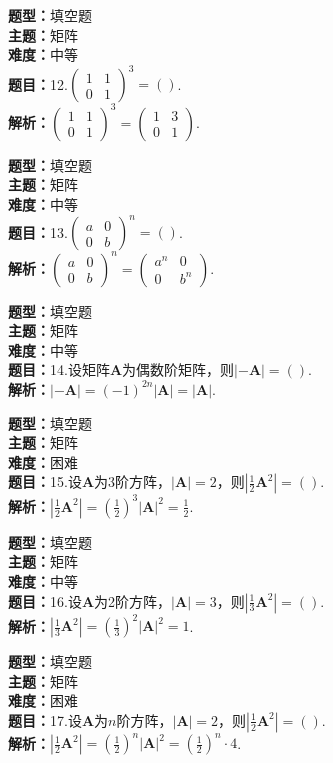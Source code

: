 \documentclass{ctexart}
\newenvironment{question}[5]{%
	\noindent\textbf{题型：}#1\\
	\textbf{主题：}#2\\
	\textbf{难度：}#3\\
	\textbf{题目：}#4\\
	\textbf{解析：}#5\\
	\vspace{1em}
}{}
\begin{document}
	\begin{question}
		{填空题}
		{矩阵}
		{中等}
		{12.\(\left(\begin{array}{ll}1 & 1 \\ 0 & 1\end{array}\right)^3=()\). }
		{\(\left(\begin{array}{ll}1 & 1 \\ 0 & 1\end{array}\right)^3=\left(\begin{array}{ll}1 & 3 \\ 0 & 1\end{array}\right)\). }
	\end{question}
	
	\begin{question}
		{填空题}
		{矩阵}
		{中等}
		{13.\(\left(\begin{array}{ll}a & 0 \\ 0 & b\end{array}\right)^n=()\). }
		{\(\left(\begin{array}{ll}a & 0 \\ 0 & b\end{array}\right)^n=\left(\begin{array}{cc}a^n & 0 \\ 0 & b^n\end{array}\right)\). }
	\end{question}
	
	\begin{question}
		{填空题}
		{矩阵}
		{中等}
		{14.设矩阵\(\mathbf{A}\)为偶数阶矩阵，则\(|-\mathbf{A}|=()\). }
		{\(|-\mathbf{A}|=(-1)^{2n}|\mathbf{A}|=|\mathbf{A}|\). }
	\end{question}
	
	\begin{question}
		{填空题}
		{矩阵}
		{困难}
		{15.设\(\mathbf{A}\)为3阶方阵，\(|\mathbf{A}|=2\)，则\(\left|\frac{1}{2}\mathbf{A}^2\right|=()\). }
		{\(\left|\frac{1}{2}\mathbf{A}^2\right|=\left(\frac{1}{2}\right)^3|\mathbf{A}|^2=\frac{1}{2}\). }
	\end{question}
	
	\begin{question}
		{填空题}
		{矩阵}
		{中等}
		{16.设\(\mathbf{A}\)为2阶方阵，\(|\mathbf{A}|=3\)，则\(\left|\frac{1}{3}\mathbf{A}^2\right|=()\). }
		{\(\left|\frac{1}{3}\mathbf{A}^2\right|=\left(\frac{1}{3}\right)^2|\mathbf{A}|^2=1\). }
	\end{question}
	
	\begin{question}
		{填空题}
		{矩阵}
		{困难}
		{17.设\(\mathbf{A}\)为\(n\)阶方阵，\(|\mathbf{A}|=2\)，则\(\left|\frac{1}{2}\mathbf{A}^2\right|=()\). }
		{\(\left|\frac{1}{2}\mathbf{A}^2\right|=\left(\frac{1}{2}\right)^n|\mathbf{A}|^2=\left(\frac{1}{2}\right)^n\cdot4\). }
	\end{question}
	
\end{document}
